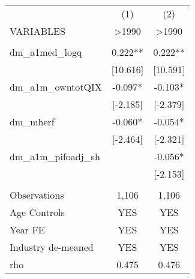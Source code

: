 \documentclass[]{article}
\begin{document}
\begin{tabular}{lcc} \hline
 & (1) & (2) \\
VARIABLES & >1990 & >1990 \\ \hline
 &  &  \\
dm\_a1med\_logq & 0.222** & 0.222** \\
 & [10.616] & [10.591] \\
dm\_a1m\_owntotQIX & -0.097* & -0.103* \\
 & [-2.185] & [-2.379] \\
dm\_mherf & -0.060* & -0.054* \\
 & [-2.464] & [-2.321] \\
dm\_a1m\_pifoadj\_sh &  & -0.056* \\
 &  & [-2.153] \\
 &  &  \\
Observations & 1,106 & 1,106 \\
Age Controls & YES & YES \\
Year FE & YES & YES \\
Industry de-meaned & YES & YES \\
 rho & 0.475 & 0.476 \\ \hline
\end{tabular}
\end{document}
